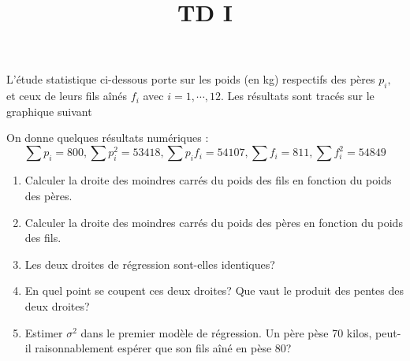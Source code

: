 \documentclass{td_um}
\title{TD I}
\providecommand{\1}{\mathds{1}}
\begin{document}
\maketitle

\exo{}
L'étude statistique ci-dessous porte sur les poids (en kg) respectifs des pères $p_{i},$ et ceux de leurs fils aînés $f_{i}$ avec $i=1,\cdots,12$. Les résultats sont tracés sur le graphique suivant

\begin{center}
\end{center}

On donne quelques résultats numériques :
$$
\sum p_{i}=800, \sum p_{i}^{2}=53418, \sum p_{i} f_{i}=54107, \sum f_{i}=811, \sum f_{i}^{2}=54849
$$
\begin{enumerate}
    \item  Calculer la droite des moindres carrés du poids des fils en fonction du poids des pères.
    \item  Calculer la droite des moindres carrés du poids des pères en fonction du poids des fils.
    \item  Les deux droites de régression sont-elles identiques?
    \item  En quel point se coupent ces deux droites? Que vaut le produit des pentes des deux droites?
    \item  Estimer $\sigma^{2}$ dans le premier modèle de régression. Un père pèse 70 kilos, peut-il raisonnablement espérer que son fils aîné en pèse $80$?
\end{enumerate}
\end{document}
